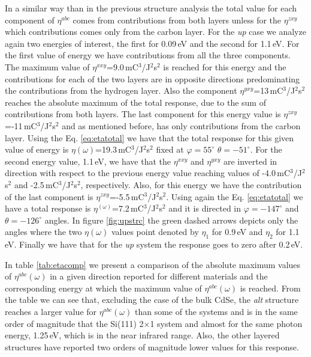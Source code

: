 \documentclass[pss]{wiley2sp} %
\begin{document}
In a similar way than in the previous structure analysis the total value for each component of $\eta^{abc}$ comes from contributions from both layers unless for the  $\eta^{zxy}$ which contributions comes only from the carbon layer. For the \emph{up} case we analyze again two energies of interest, the first for 0.09\,eV and the second for 1.1\,eV. For the first value of energy we have contributions from all the three components. The maximum value of $\eta^{xxy}$=9.0\,mC$^{3}$/J$^{2}$s$^{2}$ is reached for this energy and the contributions for each of the two layers are in opposite directions predominating the contributions from the hydrogen layer. Also the component $\eta^{yxy}$=13\,mC$^{3}$/J$^{2}$s$^{2}$ reaches the absolute maximum of the total response, due to the sum of contributions from both layers. The last component for this energy value is $\eta^{zxy}$=-11\,mC$^{3}$/J$^{2}$s$^{2}$ and as mentioned before, has only contributions from the carbon layer. Using the Eq. \ref{eq:etatotal} we have that the total response for this given value of energy is $\eta(\omega)$=19.3\,mC$^{3}$/J$^{2}$s$^{2}$ fixed at $\varphi=55^{\circ}$ $\theta=-51^{\circ}$. For the second energy value, 1.1\,eV, we have that the $\eta^{xxy}$ and $\eta^{yxy}$ are inverted in direction with respect to the previous energy value reaching values of -4.0\,mC$^{3}$/J$^{2}$s$^{2}$ and -2.5\,mC$^{3}$/J$^{2}$s$^{2}$, respectively. Also, for this energy we have the  contribution of the last component is $\eta^{zxy}$=-5.5\,mC$^{3}$/J$^{2}$s$^{2}$. Using again the Eq. \eqref{eq:etatotal} we have a total response is $\eta^(\omega)$=7.2\,mC$^{3}$/J$^{2}$s$^{2}$ and it is directed in $\varphi=-147^{\circ}$ and $\theta=-126^{\circ}$  angles. In figure \ref{fig:upstrc} the green dashed arrows depicts only the angles where the two $\eta(\omega)$ values point denoted by $\eta_{1}$ for 0.9\,eV and $\eta_{2}$ for 1.1\,eV. Finally we have that for the \emph{up} system the response goes to zero after 0.2\,eV. 

In table \ref{tab:etacomp} we present a comparison of the absolute maximum values of $\eta^{abc}(\omega)$ in a given direction reported for different materials and the corresponding energy at which the maximum value of $\eta^{abc}(\omega)$ is reached. From the table we can see that, excluding the case of the bulk CdSe, the \emph{alt} structure reaches a larger value for $\eta^{abc}(\omega)$ than some of the systems and is in the same order of magnitude that the Si(111) 2$\times$1 system and almost for the same photon energy, 1.25\,eV, which is in the near infrared range. Also, the other layered structures have reported two orders of magnitude lower values for this response. 
\end{document}
